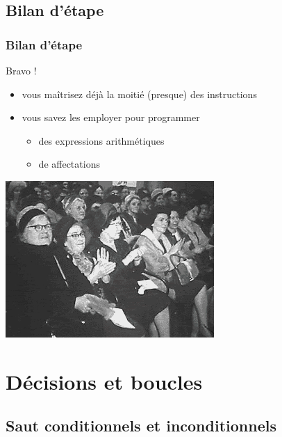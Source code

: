 \subsection{Bilan d'étape}
\begin{frame}
\frametitle{Bilan d'étape}
\begin{multicols}{2}
\alert{Bravo !}
\begin{itemize}
\item vous maîtrisez déjà la moitié (presque) des instructions
\item vous savez les employer pour programmer 
  \begin{itemize}
 \item des expressions arithmétiques
\item de affectations
  \end{itemize}
\end{itemize}

\includegraphics[width=\linewidth]{images/anim/congrats-0}

\end{multicols}

\end{frame}


\section{Décisions et boucles}

\subsection{Saut conditionnels et inconditionnels}

